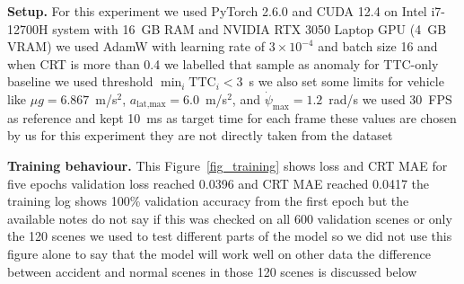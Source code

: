 \documentclass[preprint,12pt]{elsarticle}
\begin{document}
\begin{table}[H]
\caption{Data used in our experiments.}
\centering
\label{table_datasets}
\end{table}

\textbf{Setup.} For this experiment we used PyTorch 2.6.0 and CUDA 12.4 on Intel i7-12700H system with 16~GB RAM and NVIDIA RTX 3050 Laptop GPU (4~GB VRAM) we used AdamW with learning rate of $3 \times 10^{-4}$ and batch size 16 and when CRT is more than 0.4 we labelled that sample as anomaly for TTC-only baseline we used threshold $\min_i \text{TTC}_i < 3$~s we also set some limits for vehicle like $\mu g=6.867$~m/s$^2$, $a_{\text{lat,max}}=6.0$~m/s$^2$, and $\dot{\psi}_{\max}=1.2$~rad/s we used 30~FPS as reference and kept 10~ms as target time for each frame these values are chosen by us for this experiment they are not directly taken from the dataset

\textbf{Training behaviour.} This Figure~\ref{fig_training} shows loss and CRT MAE for five epochs validation loss reached 0.0396 and CRT MAE reached 0.0417 the training log shows 100\% validation accuracy from the first epoch but the available notes do not say if this was checked on all 600 validation scenes or only the 120 scenes we used to test different parts of the model so we did not use this figure alone to say that the model will work well on other data the difference between accident and normal scenes in those 120 scenes is discussed below
\end{document}
